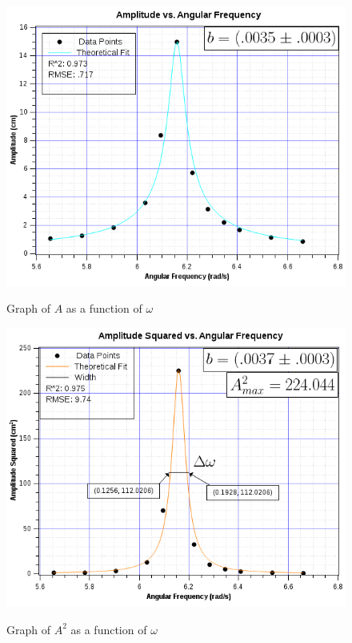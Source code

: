 \documentclass[twocolumn,english]{IEEEtran}
\theoremstyle{plain}
\theoremstyle{plain}
\begin{document}
\begin{figure}[h!]
  \begin{centering}
  \begin{center}
  \includegraphics[width=\linewidth]{./Images/graph_amplitude_vw.png}
  \label{fig:graph_amplitude_vw}
  \caption{Graph of $A$ as a function of $\omega$}
  \end{center}
  \par\end{centering}
\end{figure}

\begin{figure}[h!]
  \begin{centering}
  \begin{center}
  \includegraphics[width=\linewidth]{./Images/graph_amplitude_squared_vw.png}
  \label{fig:graph_amplitude_squared_vw}
  \caption{Graph of $A^2$ as a function of $\omega$}
  \end{center}
  \par\end{centering}
\end{figure}
\end{document}
